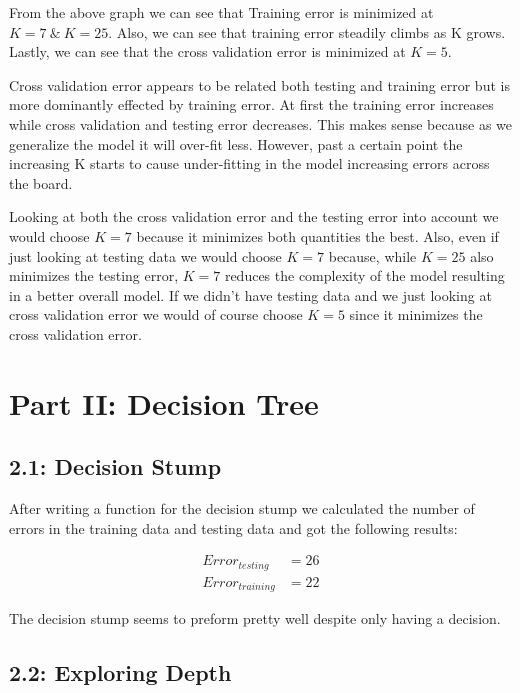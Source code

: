\documentclass{article}
\begin{document}
	From the above graph we can see that Training error is minimized at $K = 7 \ \& \ K = 25$. Also, we can see that training error steadily climbs as K grows. Lastly, we can see that the cross validation error is minimized at $K = 5$. 
	
	
	Cross validation error appears to be related both testing and training error but is more dominantly effected by training error. At first the training error increases while cross validation and testing error decreases. This makes sense because as we generalize the model it will over-fit less. However, past a certain point the increasing K starts to cause under-fitting in the model increasing errors across the board. 
	
	Looking at both the cross validation error and the testing error into account we would choose $K = 7 $ because it minimizes both quantities the best. Also, even if just looking at testing data we would choose $K = 7$ because, while $K = 25$ also minimizes the testing error, $K = 7$ reduces the complexity of the model resulting in a better overall model. If we didn't have testing data and we just looking at cross validation error we would of course choose $K = 5$ since it minimizes the cross validation error.
	
	\newpage
	
	\section*{Part II: Decision Tree}
	
	\subsection*{2.1: Decision Stump}
	
	After writing a function for the decision stump we calculated the number of errors in the training data and testing data and got the following results:
	
	\begin{align}
		Error_{testing} &= 26\\
		Error_{training} &= 22
	\end{align}
	
	The decision stump seems to preform pretty well despite only having a decision.
	
	\subsection*{2.2: Exploring Depth}
	
\end{document}
